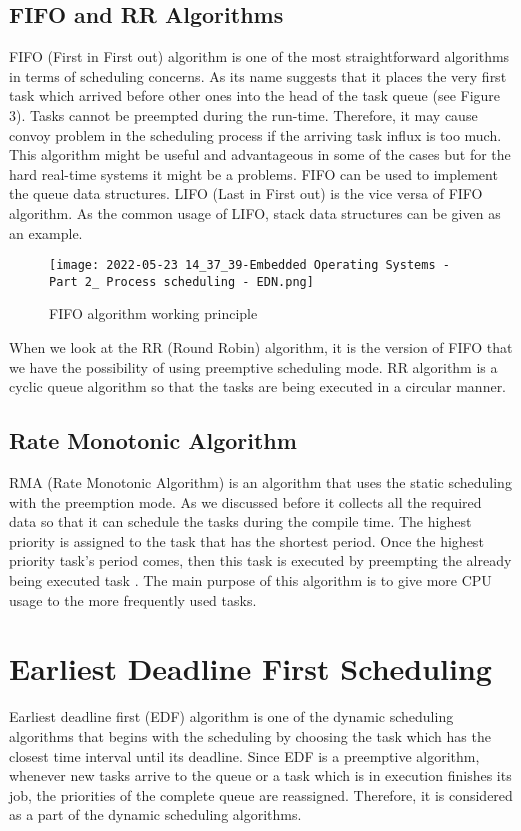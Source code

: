 \documentclass[conference]{IEEEtran}
\begin{document}
\subsection{FIFO and RR Algorithms}
FIFO (First in First out) algorithm is one of the most straightforward algorithms in terms of scheduling concerns. As its name suggests that it places the very first task which arrived before other ones into the head of the task queue (see Figure 3). Tasks cannot be preempted during the run-time. Therefore, it may cause convoy problem in the scheduling process if the arriving task influx is too much. This algorithm might be useful and advantageous in some of the cases but for the hard real-time systems it might be a problems. FIFO can be used to implement the queue data structures. LIFO (Last in First out) is the vice versa of FIFO algorithm. As the common usage of LIFO, stack data structures can be given as an example. \\

\begin{figure}[h]
    \centering
    \texttt{[image: 2022-05-23 14\_37\_39-Embedded Operating Systems - Part 2\_ Process scheduling - EDN.png]}
    \caption{FIFO algorithm working principle \cite{EDN}}
    \label{fig:FIFO algorithm working principle}
\end{figure}

When we look at the RR (Round Robin) algorithm, it is the version of FIFO that we have the possibility of using preemptive scheduling mode. RR algorithm is a cyclic queue algorithm so that the tasks are being executed in a circular manner. \\

\subsection{Rate Monotonic Algorithm}
RMA (Rate Monotonic Algorithm) is an algorithm that uses the static scheduling with the preemption mode. As we discussed before it collects all the required data so that it can schedule the tasks during the compile time. The highest priority is assigned to the task that has the shortest period. Once the highest priority task's period comes, then this task is executed by preempting the already being executed task \cite{tik}. The main purpose of this algorithm is to give more CPU usage to the more frequently used tasks. \\

\section{Earliest Deadline First Scheduling}
Earliest deadline first (EDF) algorithm is one of the dynamic scheduling algorithms that begins with the scheduling by choosing the task which has the closest time interval until its deadline. Since EDF is a preemptive algorithm, whenever new tasks arrive to the queue or a task which is in execution finishes its job, the priorities of the complete queue are reassigned. Therefore, it is considered as a part of the dynamic scheduling algorithms. \\
\end{document}
